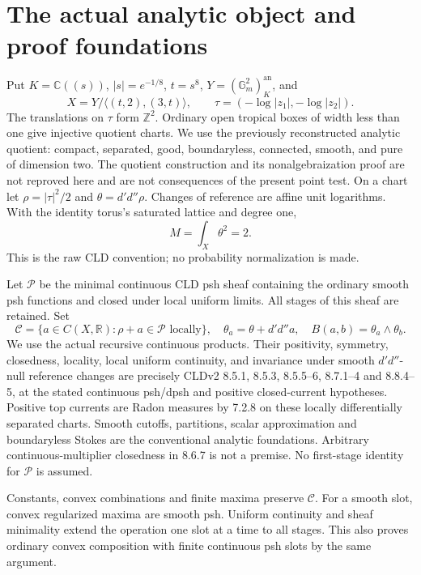 \documentclass[11pt]{article}
\newcommand{\DD}{d'd''}
\newcommand{\C}{\mathcal C}
\newcommand{\RR}{\mathbb R}
\theoremstyle{remark}\newtheorem{remark}[theorem]{Remark}
\begin{document}
\section{The actual analytic object and proof foundations}
Put $K=\mathbb C((s))$, $|s|=e^{-1/8}$, $t=s^8$,
$Y=(\mathbb G_m^2)^{\mathrm{an}}_K$, and
\[
 X=Y/\langle(t,2),(3,t)\rangle,\qquad
 \tau=(-\log|z_1|,-\log|z_2|).
\]
The translations on $\tau$ form $\mathbb Z^2$. Ordinary open tropical
boxes of width less than one give injective quotient charts. We use
the previously reconstructed analytic quotient: compact, separated,
good, boundaryless, connected, smooth, and pure of dimension two.
The quotient construction and its nonalgebraization proof are not
reproved here and are not consequences of the present point test.
On a chart let $\rho=|\tau|^2/2$ and $\theta=\DD\rho$.
Changes of reference are affine unit logarithms. With the identity
torus's saturated lattice and degree one,
\[
 M=\int_X\theta^2=2.
\]
This is the raw CLD convention; no probability normalization is made.

Let $\mathscr P$ be the minimal continuous CLD psh sheaf containing
the ordinary smooth psh functions and closed under local uniform
limits. All stages of this sheaf are retained. Set
\[
 \C=\{a\in C(X,\RR):\rho+a\in\mathscr P\text{ locally}\},\quad
 \theta_a=\theta+\DD a,\quad B(a,b)=\theta_a\wedge\theta_b.
\]
We use the actual recursive continuous products. Their positivity,
symmetry, closedness, locality, local uniform continuity, and
invariance under smooth $\DD$-null reference changes are precisely
CLDv2 8.5.1, 8.5.3, 8.5.5--6, 8.7.1--4 and 8.8.4--5, at the stated
continuous psh/dpsh and positive closed-current hypotheses. Positive
top currents are Radon measures by 7.2.8 on these locally
differentially separated charts. Smooth cutoffs, partitions, scalar
approximation and boundaryless Stokes are the conventional analytic
foundations. Arbitrary continuous-multiplier closedness in 8.6.7 is
not a premise. No first-stage identity for $\mathscr P$ is assumed.

Constants, convex combinations and finite maxima preserve $\C$.
For a smooth slot, convex regularized maxima are smooth psh.
Uniform continuity and sheaf minimality extend the operation one
slot at a time to all stages. This also proves ordinary convex
composition with finite continuous psh slots by the same argument.
\end{document}
